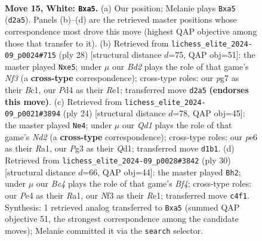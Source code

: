 \documentclass[11pt]{article}
\begin{document}
\clearpage

\begin{figure}[p]\centering
\begin{subfigure}{0.46\textwidth}\centering
\resizebox{\linewidth}{!}{%
\newchessgame
\chessboard[
  setfen={rr4k1/p1pbqppp/1p2pn2/n7/2BPP2P/5NP1/PP1B1P2/R2QR1K1 w - - 1 15},
  showmover=false,
  pgfstyle=straightmove, color=movearrow, markmove={d2-a5}
]}
\caption{}
\end{subfigure}\hfill
\begin{subfigure}{0.46\textwidth}\centering
\resizebox{\linewidth}{!}{%
\newchessgame
\chessboard[
  setfen={r2qnrk1/1p3pbp/p2p2p1/2pPn3/P3P3/R2B1N1P/1P3PP1/2BQR1K1 w - - 5 15},
  showmover=false,
  pgfstyle=straightmove, color=movearrow, markmove={f3-e5}
]}
\caption{}
\end{subfigure}
\\[4pt]
\begin{subfigure}{0.46\textwidth}\centering
\resizebox{\linewidth}{!}{%
\newchessgame
\chessboard[
  setfen={r1bq1rk1/1pp2pp1/p1n4p/3np3/P1B5/2PPB2P/2PN1PP1/R2Q1RK1 w - - 0 13},
  showmover=false,
  pgfstyle=straightmove, color=movearrow, markmove={d2-e4}
]}
\caption{}
\end{subfigure}\hfill
\begin{subfigure}{0.46\textwidth}\centering
\resizebox{\linewidth}{!}{%
\newchessgame
\chessboard[
  setfen={r3r1k1/pp2qpbp/3p2p1/2pPn2n/4PB2/2N4P/PP1QBPP1/R3R1K1 w - - 9 16},
  showmover=false,
  pgfstyle=straightmove, color=movearrow, markmove={f4-h2}
]}
\caption{}
\end{subfigure}
\caption{\textbf{Move 15, White: \texttt{Bxa5}.} (a) Our position; Melanie plays \texttt{Bxa5} (\texttt{d2a5}). Panels (b)--(d) are the retrieved master positions whose correspondence most drove this move (highest QAP objective among those that transfer to it). (b) Retrieved from \texttt{lichess\_elite\_2024-09\_p0024\#715} (ply 28) [structural distance $d$=75, QAP obj=51]: the master played \texttt{Nxe5}; under $\mu$ our \emph{Bd2} plays the role of that game's \emph{Nf3} (a \textbf{cross-type} correspondence); cross-type roles: our \emph{p}g7 as their \emph{B}c1, our \emph{P}d4 as their \emph{R}e1; transferred move \texttt{d2a5} \textbf{(endorses this move)}. (c) Retrieved from \texttt{lichess\_elite\_2024-09\_p0021\#3894} (ply 24) [structural distance $d$=78, QAP obj=45]: the master played \texttt{Ne4}; under $\mu$ our \emph{Qd1} plays the role of that game's \emph{Nd2} (a \textbf{cross-type} correspondence); cross-type roles: our \emph{p}e6 as their \emph{R}a1, our \emph{P}g3 as their \emph{Q}d1; transferred move \texttt{d1b1}. (d) Retrieved from \texttt{lichess\_elite\_2024-09\_p0028\#3842} (ply 30) [structural distance $d$=66, QAP obj=44]: the master played \texttt{Bh2}; under $\mu$ our \emph{Bc4} plays the role of that game's \emph{Bf4}; cross-type roles: our \emph{P}e4 as their \emph{R}a1, our \emph{N}f3 as their \emph{R}e1; transferred move \texttt{c4f1}. Synthesis: 1 retrieved analog transferred to \texttt{Bxa5} (summed QAP objective 51, the strongest correspondence among the candidate moves); Melanie committed it via the \texttt{search} selector.}
\label{fig:thought-m28}
\end{figure}
\end{document}
